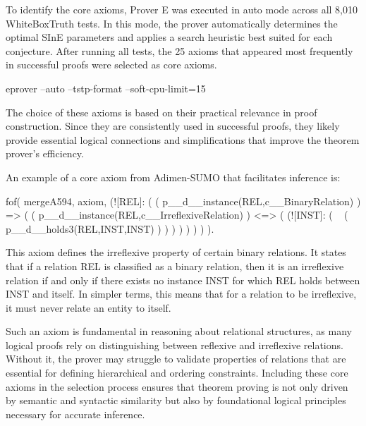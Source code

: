 \documentclass[english,version-2020-11]{uzl-thesis}
\begin{document}
To identify the core axioms, Prover E was executed in auto mode across all 8,010 WhiteBoxTruth tests. In this mode, the prover automatically determines the optimal SInE parameters and applies a search heuristic best suited for each conjecture. After running all tests, the 25 axioms that appeared most frequently in successful proofs were selected as core axioms.

\begin{Pseudocode}[morekeywords = {add, create}, deletekeywords={to}, numbers=left,
    caption = {Prover E configuration}]
    eprover --auto --tstp-format --soft-cpu-limit=15
\end{Pseudocode}


The choice of these axioms is based on their practical relevance in proof construction. Since they are consistently used in successful proofs, they likely provide essential logical connections and simplifications that improve the theorem prover's efficiency.

An example of a core axiom from Adimen-SUMO that facilitates inference is:


\begin{Pseudocode}[morekeywords = {add, create}, deletekeywords={to}, numbers=left, caption = {Example core axiom}]
    fof( mergeA594, axiom,
        (![REL]: 
            (
                (
                    p__d__instance(REL,c__BinaryRelation)
                )
                =>
                (
                    (
                        p__d__instance(REL,c__IrreflexiveRelation)
                    )
                    <=>
                    (
                        (![INST]: 
                            (
                                ~ (
                                    p__d__holds3(REL,INST,INST)
                                )
                            )
                        )
                    )
                )
            )
        )
    ).
\end{Pseudocode}


This axiom defines the irreflexive property of certain binary relations. It states that if a relation REL is classified as a binary relation, then it is an irreflexive relation if and only if there exists no instance INST for which REL holds between INST and itself. In simpler terms, this means that for a relation to be irreflexive, it must never relate an entity to itself.

Such an axiom is fundamental in reasoning about relational structures, as many logical proofs rely on distinguishing between reflexive and irreflexive relations. Without it, the prover may struggle to validate properties of relations that are essential for defining hierarchical and ordering constraints. Including these core axioms in the selection process ensures that theorem proving is not only driven by semantic and syntactic similarity but also by foundational logical principles necessary for accurate inference.
\end{document}

